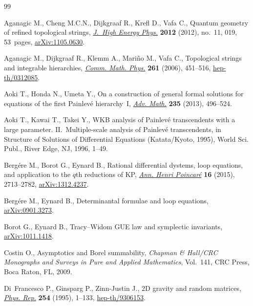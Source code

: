 \documentclass[pdftex]{sigma}
\theoremstyle{definition}
\numberwithin{equation}{section}
\begin{document}
\begin{thebibliography}{99}
\footnotesize\itemsep=0pt

Aganagic M., Cheng M.C.N., Dijkgraaf R., Kref\/l D., Vafa C., Quantum geometry of
  ref\/ined topological strings, \href{http://dx.doi.org/10.1007/JHEP11(2012)019}{\textit{J.~High Energy Phys.}} \textbf{2012}
  (2012), no.~11, 019, 53~pages, \href{http://arxiv.org/abs/1105.0630}{arXiv:1105.0630}.

Aganagic M., Dijkgraaf R., Klemm A., Mari{\~n}o M., Vafa C., Topological
  strings and integrable hierarchies, \href{http://dx.doi.org/10.1007/s00220-005-1448-9}{\textit{Comm. Math. Phys.}} \textbf{261}
  (2006), 451--516, \href{http://arxiv.org/abs/hep-th/0312085}{hep-th/0312085}.

Aoki T., Honda N., Umeta Y., On a construction of general formal solutions for
  equations of the f\/irst {P}ainlev\'e hierarchy~{I}, \href{http://dx.doi.org/10.1016/j.aim.2012.12.011}{\textit{Adv. Math.}}
  \textbf{235} (2013), 496--524.

Aoki T., Kawai T., Takei Y., W{KB} analysis of {P}ainlev\'e transcendents with
  a large parameter. {II}.~{M}ultiple-scale analysis of {P}ainlev\'e
  transcendents, in Structure of Solutions of Dif\/ferential Equations
  ({K}atata/{K}yoto, 1995), World Sci. Publ., River Edge, NJ, 1996, 1--49.

Berg{\'e}re M., Borot G., Eynard B., Rational dif\/ferential dystems, loop
  equations, and application to the $q$th reductions of {KP}, \href{http://dx.doi.org/10.1007/s00023-014-0391-8}{\textit{Ann.
  Henri Poincar\'e}} \textbf{16} (2015), 2713--2782, \href{http://arxiv.org/abs/1312.4237}{arXiv:1312.4237}.

Berg{\'e}re M., Eynard B., Determinantal formulae and loop equations,
  \href{http://arxiv.org/abs/0901.3273}{arXiv:0901.3273}.

Borot G., Eynard B., {T}racy--{W}idom GUE law and symplectic invariants,
  \href{http://arxiv.org/abs/1011.1418}{arXiv:1011.1418}.

Costin O., Asymptotics and {B}orel summability, \textit{Chapman {\rm \&} Hall/CRC
  Monographs and Surveys in Pure and Applied Mathematics}, Vol.~141, CRC Press,
  Boca Raton, FL, 2009.

Di~Francesco P., Ginsparg P., Zinn-Justin J., {$2$}{D} gravity and random
  matrices, \href{http://dx.doi.org/10.1016/0370-1573(94)00084-G}{\textit{Phys. Rep.}} \textbf{254} (1995), 1--133,
  \href{http://arxiv.org/abs/hep-th/9306153}{hep-th/9306153}.


\end{thebibliography}
\end{document}
